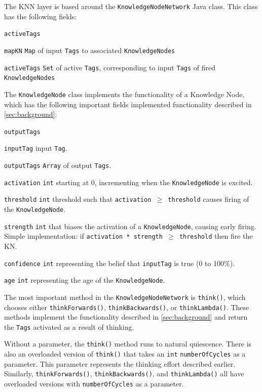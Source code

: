 \documentclass[titlepage,11pt]{article}
\newcommand{\ar}[1]{\autoref{#1}}
\newcommand{\code}[1]{\texttt{#1}}
\begin{document}
The KNN layer is based around the \code{KnowledgeNodeNetwork} Java class. This class has the following fields:

\begin{labeling}{\code{activeTags}}
	\item[\code{mapKN}] \code{Map} of input \code{Tags} to associated \code{KnowledgeNodes}
	\item[\code{activeTags}] \code{Set} of active \code{Tags}, corresponding to input \code{Tags} of fired \code{KnowledgeNodes}
\end{labeling}

The \code{KnowledgeNode} class implements the functionality of a Knowledge Node, which has the following important fields implemented functionality described in \autoref{sec:background}:

\begin{labeling}{\code{outputTags}}
	\item[\code{inputTag}] input \code{Tag}.
	\item[\code{outputTags}] \code{Array} of output \code{Tags}.
	\item[\code{activation}] \code{int} starting at 0, incrementing when the \code{KnowledgeNode} is excited.
	\item[\code{threshold}] \code{int} threshold such that \code{activation $\geq$ threshold} causes firing of the \code{KnowledgeNode}.
	\item[\code{strength}] \code{int} that biases the activation of a \code{KnowledgeNode}, causing early firing. Simple implementation: if \code{activation * strength $\geq$ threshold} then fire the KN.
	\item[\code{confidence}] \code{int} representing the belief that \code{inputTag} is true (0 to 100\%).
	\item[\code{age}] \code{int} representing the age of the \code{KnowledgeNode}.
\end{labeling}

The most important method in the \code{KnowledgeNodeNetwork} is \code{think()}, which chooses either \code{thinkForwards()}, \code{thinkBackwards()}, or \code{thinkLambda()}. These methods implement the functionality described in \ar{sec:background} and return the \code{Tags} activated as a result of thinking.

Without a parameter, the \code{think()} method runs to natural quiescence. There is also an overloaded version of \code{think()} that takes an \code{int} \code{numberOfCycles} as a parameter. This parameter represents the thinking effort described earlier. Similarly, \code{thinkForwards()}, \code{thinkBackwards()}, and \code{thinkLambda()} all have overloaded versions with \code{numberOfCycles} as a parameter.
\end{document}
